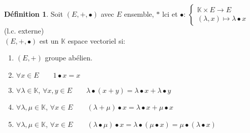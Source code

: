 \documentclass[10pt,a4paper]{article}
\theoremstyle{definition}
\newtheorem{definition}[proposition]{Définition}
\begin{document}
\begin{definition}
Soit $(E, + , \bullet)$ avec $E$ ensemble, $*$ lci et $\bullet$: $\begin{cases}
\mathbb{K} \times E \to E \\
(\lambda, x) \mapsto \lambda \bullet x
\end{cases}$
(l.c. externe) \\
$(E, +, \bullet)$ est un $\mathbb{K}$ espace vectoriel si:
\begin{enumerate}
\item $(E, +)$ groupe abélien.
\item $\forall x \in E \qquad 1 \bullet x = x$
\item $\forall \lambda \in \mathbb{K}$, $\forall x, y \in E \qquad \lambda \bullet (x + y) = \lambda \bullet x + \lambda \bullet y$
\item $\forall \lambda, \mu \in \mathbb{K}$, $\forall x \in E \qquad (\lambda + \mu) \bullet x = \lambda \bullet x + \mu \bullet x$
\item $\forall \lambda, \mu \in \mathbb{K}$, $\forall x \in E \qquad (\lambda \bullet \mu) \bullet x = \lambda \bullet (\mu \bullet x) = \mu \bullet (\lambda \bullet x)$
\end{enumerate}
\end{definition}
\end{document}
